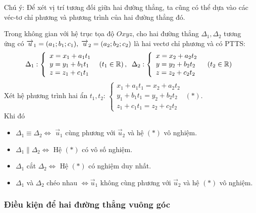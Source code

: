 \begin{note} Chú ý: Để xét vị trí tương đối giữa hai đường thẳng, ta cũng có thể dựa vào các véc-tơ chỉ phương và phương trình của hai đường thẳng đó.
\end{note}
 Trong không gian với hệ trục tọa độ $Oxyz$, cho hai đường thẳng $\Delta _{1} ,\Delta _{2} $ tương ứng có $\overrightarrow{u}_{1} =(a_{1} ;b_{1} ;c_{1} ),{\rm \; }\overrightarrow{u}_{2} =(a_{2} ;b_{2} ;c_{2} )$ là hai vectơ chỉ phương và có PTTS:
\[\Delta _{1} :\left\{\begin{array}{l} {x=x_{1} +a_{1} t_{1} } \\ {y=y_{1} +b_{1} t_{1} } \\ {z=z_{1} +c_{1} t_{1} } \end{array}\right. {\rm \; }\left(t_{1} \in  \mathbb{R}\right),{\rm \; \; }\Delta _{2} :\left\{\begin{array}{l} {x=x_{2} +a_{2} t_{2} } \\ {y=y_{2} +b_{2} t_{2} } \\ {z=z_{2} +c_{2} t_{2} } \end{array}\right. {\rm \; \; }\left(t_{2} \in  \mathbb{R}\right)\] 
 Xét hệ phương trình hai ẩn $t_{1} ,t_{2} $: $\left\{\begin{array}{l} {x_{1} +a_{1} t_{1} =x_{2} +a_{2} t_{2} } \\ {y_{1} +b_{1} t_{1} =y_{2} +b_{2} t_{2} } \\ {z_{1} +c_{1} t_{1} =z_{2} +c_{2} t_{2} } \end{array}\right. $ \quad$\left(*\right)$.\\
 Khi đó
\begin{itemize}
	\item  $\Delta _{1} \equiv \Delta _{2} \Leftrightarrow $ $\overrightarrow{u}_{1} $ cùng phương với $\overrightarrow{u}_{2} $ và hệ $\left(*\right)$ vô nghiệm.
	\item  $\Delta _{1} \parallel \Delta _{2} \Leftrightarrow $ Hệ $\left(*\right)$ có vô số nghiệm.
	\item  $\Delta _{1} $ cắt $\Delta _{2} \Leftrightarrow $ Hệ $\left(*\right)$ có nghiệm duy nhất.
	\item  $\Delta _{1} $ và $\Delta _{2} $ chéo nhau $\Leftrightarrow \overrightarrow{u}_{1} $ không cùng phương với $\overrightarrow{u}_{2} $ và hệ $\left(*\right)$ vô nghiệm.
\end{itemize}

\subsubsection{Điều kiện để hai đường thẳng vuông góc}

